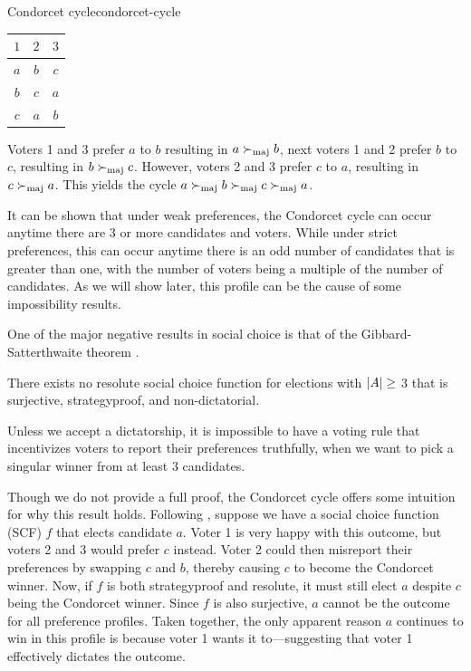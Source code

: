 \begin{example}{Condorcet cycle}{condorcet-cycle}
	\begin{minipage}{0.15\linewidth}
		\begin{tabular}{ccc}
			\toprule
			$1$ & $2$ & $3$  \\
			\midrule
			$a$ & $b$ & $c $ \\
			$b$ & $c$ & $a $ \\
			$c$ & $a$ & $b $ \\
			\bottomrule
		\end{tabular}
	\end{minipage}
	\hspace{0.02\linewidth}
	\begin{minipage}{0.78\linewidth}
		Voters 1 and 3  prefer $a$ to $b$ resulting in $a \succ_{\textnormal{maj}} b$,
		next voters 1 and 2 prefer $b$ to $c$, resulting in $b \succ_{\textnormal{maj}}
			c$. However, voters 2 and 3 prefer $c$ to $a$, resulting in $c
			\succ_{\textnormal{maj}} a$. This yields the cycle $a \succ_{\textnormal{maj}} b \succ_{\textnormal{maj}} c
			\succ_{\textnormal{maj}} a$.
	\end{minipage}
\end{example}

It can be shown that under weak preferences, the Condorcet
cycle can occur anytime there are 3 or more candidates and voters. While
under strict preferences, this can occur anytime there is an odd number of candidates that is greater than one, with the number of voters being a multiple of the
number of candidates. As we will show later, this profile can be the cause of
some impossibility results.

One of the major negative results in social choice is that of the
Gibbard-Satterthwaite theorem
\citep{gibbardManipulationVotingSchemes1973,satterthwaiteStrategyproofnessArrowsConditions1975}.

\begin{theorem}
	\label{thm:gs-thm}
	There exists no resolute social choice function for elections with $|A| \geq$ 3 that is surjective, strategyproof, and non-dictatorial.
\end{theorem}

Unless we accept a dictatorship, it is impossible to have a voting
rule that incentivizes voters to report their preferences truthfully, when we
want to pick a singular winner from at least 3 candidates.

Though we do not provide a full proof, the Condorcet cycle offers some intuition
for why this result holds. Following , suppose we have
a social choice function (SCF) $f$ that elects candidate $a$. Voter 1 is very
happy with this outcome, but voters 2 and 3 would prefer $c$ instead. Voter 2
could then misreport their preferences by swapping $c$ and $b$, thereby causing
$c$ to become the Condorcet winner. Now, if $f$ is both strategyproof and
resolute, it must still elect $a$ despite $c$ being the Condorcet winner. Since
$f$ is also surjective, $a$ cannot be the outcome for all preference profiles.
Taken together, the only apparent reason $a$ continues to win in this profile is
because voter 1 wants it to—suggesting that voter 1 effectively dictates the
outcome.

